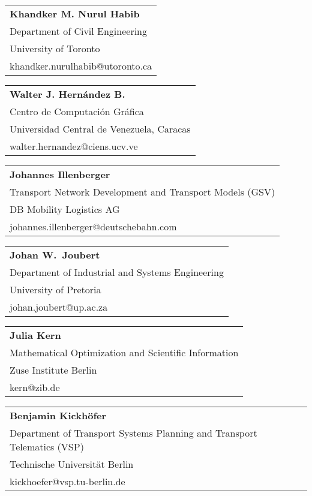 \begin{tabular}[width=0.48\textwidth]{@{}l}
\textbf{Khandker M. Nurul Habib} \\
Department of Civil Engineering \\
University of Toronto \\
khandker.nurulhabib@utoronto.ca  \\
\end{tabular}

\begin{tabular}[width=0.48\textwidth]{@{}l}
\textbf{Walter J. Hernández B.} \\
Centro de Computación Gráfica \\
Universidad Central de Venezuela, Caracas \\
walter.hernandez@ciens.ucv.ve \\
\end{tabular}

\begin{tabular}[width=0.48\textwidth]{@{}l}
\textbf{Johannes Illenberger} \\
Transport Network Development and Transport Models (GSV) \\
DB Mobility Logistics AG \\
johannes.illenberger@deutschebahn.com  \\
\end{tabular}

\begin{tabular}[width=0.48\textwidth]{@{}l}
\textbf{Johan W.\ Joubert} \\
Department of Industrial and Systems Engineering \\
University of Pretoria \\
johan.joubert@up.ac.za  \\
\end{tabular}

\begin{tabular}[width=0.48\textwidth]{@{}l}
\textbf{Julia Kern} \\
Mathematical Optimization and Scientific Information \\
Zuse Institute Berlin \\
kern@zib.de \\
\end{tabular}

\begin{tabular}[width=0.48\textwidth]{@{}l}
\textbf{Benjamin Kickhöfer} \\
Department of Transport Systems Planning and Transport Telematics (VSP) \\
Technische Universität Berlin \\
kickhoefer@vsp.tu-berlin.de \\
\end{tabular}

